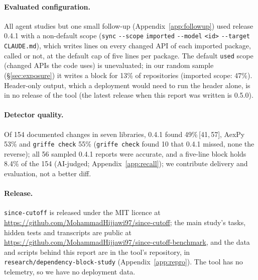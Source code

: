 \documentclass[11pt]{article}
\newcommand{\tool}{\texttt{since-cutoff}\xspace}
\newcommand{\ci}[2]{\,[#1,\,#2]}
\newcommand{\code}[1]{\texttt{#1}}
\newcommand{\flag}[1]{\texttt{-{}-#1}}%
\newcommand{\repo}{\url{https://github.com/MohammadHijjawi97/since-cutoff}}
\newcommand{\benchrepo}{\url{https://github.com/MohammadHijjawi97/since-cutoff-benchmark}}
\begin{document}
\paragraph{Evaluated configuration.}
All agent studies but one small follow-up (Appendix~\ref{app:followup}) used release 0.4.1 with a non-default scope (\code{sync} \flag{scope} \code{imported} \flag{model} \code{<id>} \flag{target} \code{CLAUDE.md}), which writes lines on every changed API of each imported package, called or not, at the default cap of five lines per package.
The default \code{used} scope (changed APIs the code uses) is unevaluated; in our random sample (\S\ref{sec:exposure}) it writes a block for 13\% of repositories (imported scope: 47\%).
Header-only output, which a deployment would need to run the header alone, is in no release of the tool (the latest release when this report was written is 0.5.0).

\paragraph{Detector quality.}
Of 154 documented changes in seven libraries, 0.4.1 found 49\%\ci{41}{57}, AexPy 53\% and \code{griffe check} 55\% (\code{griffe check} found 10 that 0.4.1 missed, none the reverse); all 56 sampled 0.4.1 reports were accurate, and a five-line block holds 8.4\% of the 154 (AI-judged; Appendix~\ref{app:recall}); we contribute delivery and evaluation, not a better diff.

\paragraph{Release.}
\tool is released under the MIT licence at \repo; the main study's tasks, hidden tests and transcripts are public at \benchrepo, and the data and scripts behind this report are in the tool's repository, in \code{research/dependency-block-study} (Appendix~\ref{app:repro}).
The tool has no telemetry, so we have no deployment data.
\end{document}
